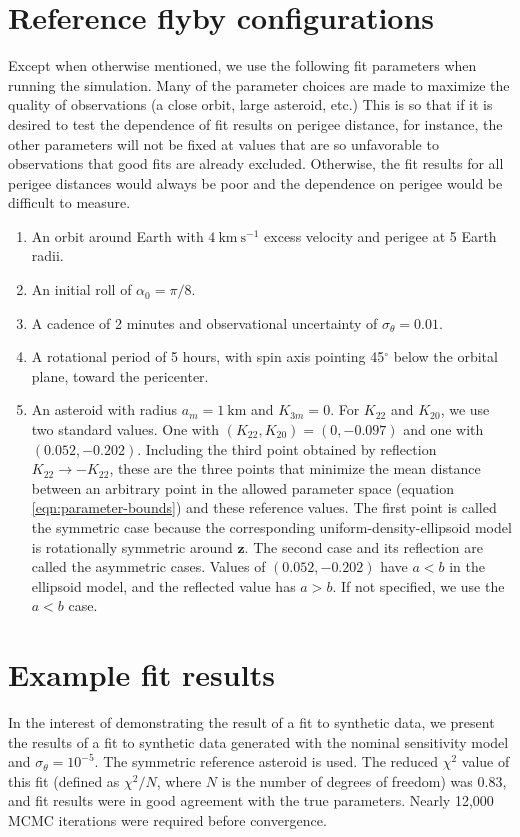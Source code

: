 \documentclass[linenumbers]{aastex631}
\newcommand{\unit}[1]{\hat{\mathbf{#1}}}
\newcommand{\siunit}[1]{\ \textrm{#1}}
\newcommand{\per}[1]{\ \textrm{#1}^{-1}}
\begin{document}
\section{Reference flyby configurations}
\label{app:reference-config}
Except when otherwise mentioned, we use the following fit parameters when running the simulation. Many of the parameter choices are made to maximize the quality of observations (a close orbit, large asteroid, etc.) This is so that if it is desired to test the dependence of fit results on perigee distance, for instance, the other parameters will not be fixed at values that are so unfavorable to observations that good fits are already excluded. Otherwise, the fit results for all perigee distances would always be poor and the dependence on perigee would be difficult to measure.
\begin{enumerate}
  \item An orbit around Earth with $4\siunit{km}\per{s}$ excess velocity and perigee at 5 Earth radii.
  \item An initial roll of $\alpha_0=\pi/8$.
  \item A cadence of 2 minutes and observational uncertainty of $\sigma_\theta = 0.01$.
  \item A rotational period of 5 hours, with spin axis pointing 45$^\circ$ below the orbital plane, toward the pericenter.
  \item An asteroid with radius $a_m = 1\siunit{km}$ and $K_{3m}=0$. For $K_{22}$ and $K_{20}$, we use two standard values. One with $(K_{22}, K_{20}) = (0, -0.097)$ and one with $(0.052, -0.202)$. Including the third point obtained by reflection $K_{22}\rightarrow -K_{22}$, these are the three points that minimize the mean distance between an arbitrary point in the allowed parameter space (equation \ref{eqn:parameter-bounds}) and these reference values. The first point is called the symmetric case because the corresponding uniform-density-ellipsoid model is rotationally symmetric around $\unit z$. The second case and its reflection are called the asymmetric cases. Values of $(0.052, -0.202)$ have $a < b$ in the ellipsoid model, and the reflected value has $a > b$. If not specified, we use the $a < b$ case. 
\end{enumerate}



\section{Example fit results}
In the interest of demonstrating the result of a fit to synthetic data, we present the results of a fit to synthetic data generated with the nominal sensitivity model and $\sigma_\theta = 10^{-5}$. The symmetric reference asteroid is used. The reduced $\chi^2$ value of this fit (defined as $\chi^2 / N$, where $N$ is the number of degrees of freedom) was 0.83, and fit results were in good agreement with the true parameters. Nearly 12,000 MCMC iterations were required before convergence.
\end{document}

